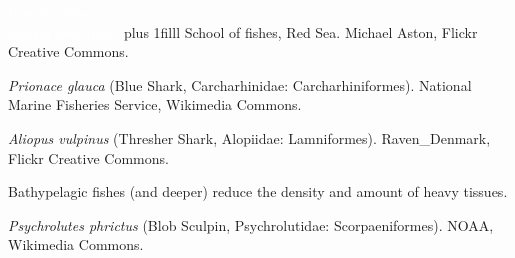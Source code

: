 \documentclass[t,handout]{beamer}  %
\begin{document}

{
\begin{frame}[t,plain]

\vspace{3\baselineskip}
\hangpara\LARGE\hspace{9em}\textcolor{white}{How do fishes}\\%
	\LARGE\hspace{9em}\textcolor{white}{control buoyancy?}
\vskip0pt plus 1filll
\tiny\textcolor{white!80!black}{School of fishes, Red Sea. Michael Aston, Flickr Creative Commons.}
\end{frame}
}


{
\begin{frame}[b,plain]

\hfill\tiny\textcolor{white!80!black}{\textit{Prionace glauca} (Blue Shark, Carcharhinidae: Carcharhiniformes). National Marine Fisheries Service, Wikimedia Commons.}

\end{frame}
}


{
\begin{frame}[b,plain]

\tiny\textcolor{white!80!black}{\textit{Aliopus vulpinus} (Thresher Shark, Alopiidae: Lamniformes). Raven\_Denmark, Flickr Creative Commons.}

\end{frame}
}

{
\begin{frame}[b,plain]{Bathypelagic fishes (and deeper) reduce the density and amount of heavy tissues.}

\hfill\tiny\textcolor{white!20!black}{\textit{Psychrolutes phrictus} (Blob Sculpin, Psychrolutidae: Scorpaeniformes). NOAA, Wikimedia Commons.}

\end{frame}
}
\end{document}
